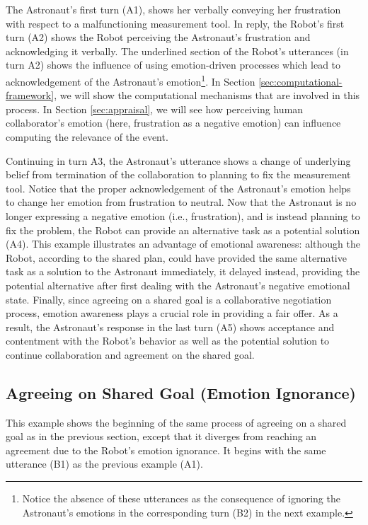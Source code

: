 The Astronaut's first turn (A1), shows her verbally conveying her frustration
with respect to a malfunctioning measurement tool. In reply, the Robot's first
turn (A2) shows the Robot perceiving the Astronaut's frustration and
acknowledging it verbally. The underlined section of the Robot's utterances (in
turn A2) shows the influence of using emotion-driven processes which lead to
acknowledgement of the Astronaut's emotion\footnote{Notice the absence of these
utterances as the consequence of ignoring the Astronaut's emotions in the
corresponding turn (B2) in the next example.}. In Section
\ref{sec:computational-framework}, we will show the computational mechanisms
that are involved in this process. In Section \ref{sec:appraisal}, we will see
how perceiving human collaborator's emotion (here, frustration as a negative
emotion) can influence computing the relevance of the event.

Continuing in turn A3, the Astronaut's utterance shows a change of underlying
belief from termination of the collaboration to planning to fix the measurement
tool. Notice that the proper acknowledgement of the Astronaut's emotion helps to
change her emotion from frustration to neutral. Now that the Astronaut is no
longer expressing a negative emotion (i.e., frustration), and is instead
planning to fix the problem, the Robot can provide an alternative task as a
potential solution (A4). This example illustrates an advantage of emotional
awareness: although the Robot, according to the shared plan, could have provided
the same alternative task as a solution to the Astronaut immediately, it delayed
instead, providing the potential alternative after first dealing with the
Astronaut's negative emotional state. Finally, since agreeing on a shared goal
is a collaborative negotiation process, emotion awareness plays a crucial role
in providing a fair offer. As a result, the Astronaut's response in the last
turn (A5) shows acceptance and contentment with the Robot's behavior as well as
the potential solution to continue collaboration and agreement on the shared
goal.

\subsection{Agreeing on Shared Goal (Emotion Ignorance)}
\label{sec:exp2}

This example shows the beginning of the same process of agreeing on a shared
goal as in the previous section, except that it diverges from reaching an
agreement due to the Robot's emotion ignorance. It begins with the same
utterance (B1) as the previous example (A1).


